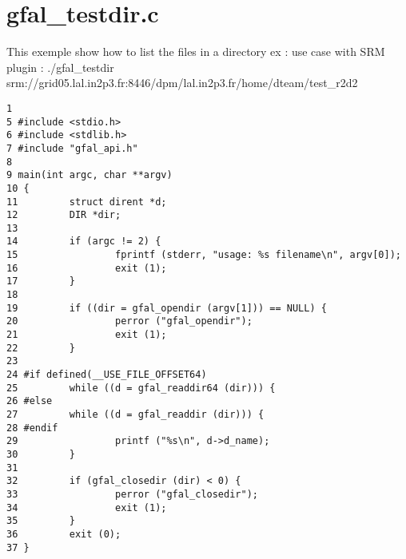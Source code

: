 \section{gfal\_\-testdir.c}
This exemple show how to list the files in a directory ex : use case with SRM plugin : ./gfal\_\-testdir srm://grid05.lal.in2p3.fr:8446/dpm/lal.in2p3.fr/home/dteam/test\_\-r2d2



\begin{DocInclude}\begin{verbatim}1 
5 #include <stdio.h>
6 #include <stdlib.h>
7 #include "gfal_api.h"
8 
9 main(int argc, char **argv)
10 {
11         struct dirent *d;
12         DIR *dir;
13 
14         if (argc != 2) {
15                 fprintf (stderr, "usage: %s filename\n", argv[0]);
16                 exit (1);
17         }
18 
19         if ((dir = gfal_opendir (argv[1])) == NULL) {
20                 perror ("gfal_opendir");
21                 exit (1);
22         }
23 
24 #if defined(__USE_FILE_OFFSET64)
25         while ((d = gfal_readdir64 (dir))) {
26 #else
27         while ((d = gfal_readdir (dir))) {
28 #endif
29                 printf ("%s\n", d->d_name);
30         }
31 
32         if (gfal_closedir (dir) < 0) {
33                 perror ("gfal_closedir");
34                 exit (1);
35         }
36         exit (0);
37 }
\end{verbatim}
\end{DocInclude}
 